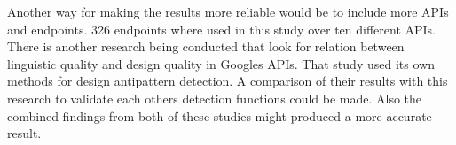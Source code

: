 Another way for making the results more reliable would be to include more APIs and endpoints. 326 endpoints where used in this study over ten different APIs. There is another research being conducted that look for relation between linguistic quality and design quality in Googles APIs. That study used its own methods for design antipattern detection. A comparison of their results with this research to validate each others detection functions could be made. Also the combined findings from both of these studies might produced a more accurate result.